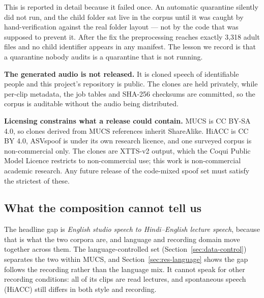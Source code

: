 This is reported in detail because it failed once. An automatic quarantine silently
did not run, and the child folder sat live in the corpus until it was caught by
hand-verification against the real folder layout --- not by the code that was
supposed to prevent it. After the fix the preprocessing reaches exactly 3{,}318 adult
files and no child identifier appears in any manifest. The lesson we record is that a
quarantine nobody audits is a quarantine that is not running.

\textbf{The generated audio is not released.} It is cloned speech of identifiable
people and this project's repository is public. The clones are held privately, while
per-clip metadata, the job tables and SHA-256 checksums are committed, so the corpus
is auditable without the audio being distributed.

\textbf{Licensing constrains what a release could contain.} MUCS is CC BY-SA 4.0, so
clones derived from MUCS references inherit ShareAlike. HiACC is CC BY 4.0, ASVspoof
is under its own research licence, and one surveyed corpus is non-commercial only. The
clones are XTTS-v2 output, which the Coqui Public Model Licence restricts to
non-commercial use; this work is non-commercial academic research.
Any future release of the code-mixed spoof set must satisfy the strictest of these.

\subsection{What the composition cannot tell us}

The headline gap is \emph{English studio speech to Hindi--English lecture speech},
because that is what the two corpora are, and language and recording domain move
together across them. The language-controlled set (Section~\ref{sec:data-control})
separates the two within MUCS, and Section~\ref{sec:res-language} shows the gap
follows the recording rather than the language mix. It cannot speak for other
recording conditions: all of its clips are read lectures, and spontaneous speech
(HiACC) still differs in both style and recording.
